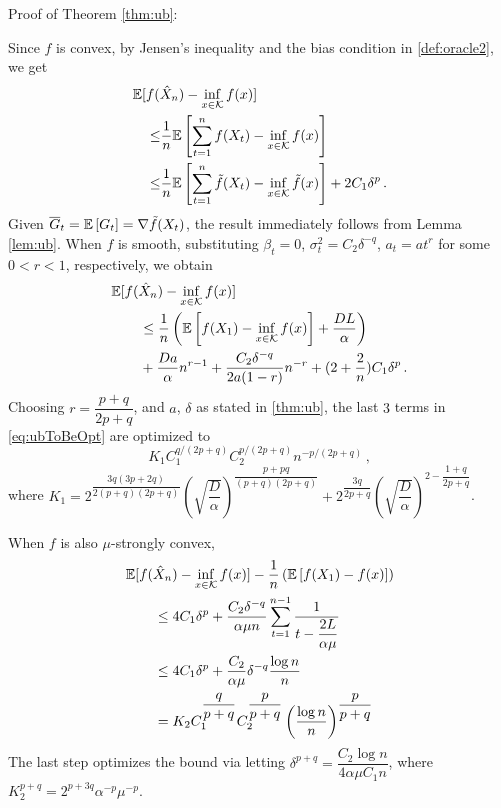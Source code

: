 Proof of Theorem \ref{thm:ub}:

Since $f$ is convex, by Jensen's inequality and the bias condition in \cref{def:oracle2}, we get
\begin{align*}
\MoveEqLeft
 \E[f(\hat X_n) - \inf_{x \in \cK} f(x)] \\
 \le&  
 \dfrac{1}{n}\EE{ \sum_{t=1}^n f(X_t) - \inf_{x \in \cK}f(x) } \\
 \le &\dfrac{1}{n}\EE{ \sum_{t=1}^n \tilde{f}(X_t) - \inf_{x \in \cK}\tilde{f}(x) } +2C_1 \delta^p
 \,.
\end{align*}
Given $\overline{G}_t=\mathbb{E}\left[G_t\right] = \nabla \tilde{f}(X_t)$,
the result immediately follows from Lemma \ref{lem:ub}. 
When $f$ is smooth,
substituting
 $\beta_t = 0$, $\sigma^2_t = C_2 \delta^{-q}$, $a_t=a t^r$ for some $0<r<1$, respectively, we obtain
 \begin{align}
 \MoveEqLeft
 \E[f(\hat X_n) - \inf_{x \in \cK} f(x)]  \nonumber\\
&\le \dfrac{1}{n}\left(\EE{f(X_1)-\inf_{x \in \cK}f(x)}+\dfrac{DL}{\alpha}  \right)\nonumber\\
&+\dfrac{Da}{\alpha} n^{r-1}+\dfrac{C_2 \delta^{-q}}{2a(1-r)}n^{-r}+ (2+\dfrac{2}{n})C_1\delta^p \,.
\label{eq:ubToBeOpt}
 \end{align}
 Choosing $r = \dfrac{p+q}{2p+q}$, and $a$, $\delta$ as stated in \cref{thm:ub}, the last $3$ terms in \eqref{eq:ubToBeOpt} are optimized to
 \[
 K_1 C_1^{q/(2p+q)} C_2^{p/(2p+q)} n ^{-p/(2p+q)} \,,
 \]
 where 
 $K_1 = 2^{\dfrac{3q(3p+2q)}{2(p+q)(2p+q)}} \left( \sqrt{\dfrac{D}{\alpha}} \right)^{\dfrac{p+pq}{(p+q)(2p+q)}}+2^{\dfrac{3q}{2p+q}} \left( \sqrt{\dfrac{D}{\alpha}} \right)^{2-\dfrac{1+q}{2p+q}}$.
 
 When $f$ is also $\mu$-strongly convex,
 \begin{align*}
 \MoveEqLeft
 \E[f(\hat X_n) - \inf_{x \in \cK} f(x)] -\dfrac{1}{n}\left(\EE{f(X_1)-f(x)}\right)\\
&\le 4C_1\delta^p+\dfrac{C_2 \delta^{-q}}{\alpha \mu n} \sum_{t=1}^{n-1}\dfrac{1}{t-\dfrac{2L}{\alpha \mu}}\\
&\le 4C_1\delta^p+\dfrac{C_2 }{\alpha \mu}\delta^{-q} \dfrac{\log n}{n}\\
&= K_2C_1^{\dfrac{q}{p+q}}C_2^{\dfrac{p}{p+q}} \left( \dfrac{\log n}{n} \right)^{\dfrac{p}{p+q}}
 \end{align*}
The last step optimizes the bound via letting 
$\delta^{p+q} =  \dfrac{C_2 \log n}{4\alpha \mu C_1 n}$, 
where
$K_2^{p+q}=2^{p+3q}\alpha^{-p}\mu^{-p}$.
